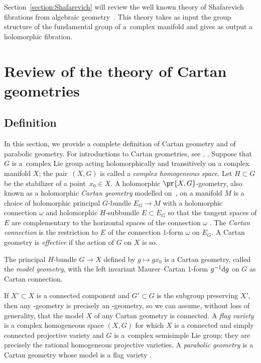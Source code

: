 \documentclass[10pt,a4paper]{amsart}
\numberwithin{equation}{section}
\begin{document}
Section~\ref{section:Shafarevich} will review the well known theory of Shafarevich fibrations from algebraic geometry~\cite{Kollar:1993,Zuo:1999}.
This theory takes as input the group structure of the fundamental group of a~complex manifold and gives as output a holomorphic fibration.


\section{Review of the theory of Cartan geometries}\label{section:review}

\subsection{Definition}

In this section, we provide a complete definition of Cartan geometry and of parabolic geometry.
For introductions to Cartan geometries, see \cite[Chapter~1]{Cap/Slovak:2009}, \cite{mckay2023introduction,Sharpe:2002}.
Suppose that $G$ is a~complex Lie group acting holomorphically and transitively on a complex manifold $X$;
the pair~$(X, G)$ is called a \emph{complex homogeneous space}.
Let $H \subset G$ be the stabilizer of a point~$x_0 \in X$.
A holomorphic $\pr{X, G}$-geometry, also known as a holomorphic \emph{Cartan geometry} modelled on~, on a manifold $M$ is a
choice of holomorphic principal $G$-bundle $E_G \to M$ with a holomorphic connection
$\omega$ and holomorphic $H$-subbundle $E \subset E_G$ so that the tangent spaces of $E$ are complementary to the horizontal
spaces of the connection $\omega$ \cite{Sharpe:2002}.
The \emph{Cartan connection} is the restriction to $E$ of the connection $1$-form $\omega$ on $E_G$.
A Cartan geometry is \emph{effective} if the action of $G$ on $X$ is so.

The principal $H$-bundle $G \to X$ defined by $g \longmapsto gx_0$ is a Cartan geometry, called the \emph{model
geometry}, with the left invariant Maurer--Cartan $1$-form $g^{-1} {\rm d}g$ on $G$ as Cartan connection.

If $X' \subset X$ is a connected component and $G' \subset G$ is the subgroup preserving $X'$, then any -geometry
is precisely an -geometry, so we can assume, without loss of generality, that the model $X$ of any Cartan geometry is connected.
A \emph{flag variety} is a complex homogeneous space $(X, G)$ for which $X$ is a connected and simply connected projective variety
and $G$ is a~complex semisimple Lie group; they are precisely the rational homogeneous projective varieties.
A \emph{parabolic geometry} is a Cartan geometry whose model is a flag variety \cite{Cap/Slovak:2009}.
\end{document}
